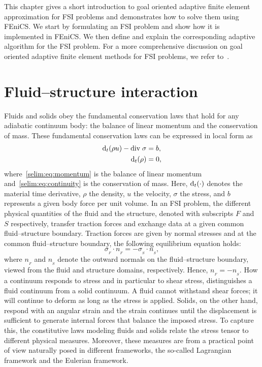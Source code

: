 This chapter gives a short introduction to goal oriented adaptive
finite element approximation for FSI problems and demonstrates how to
solve them using FEniCS. We start by formulating an FSI problem and
show how it is implemented in FEniCS. We then define and explain the
corresponding adaptive algorithm for the FSI problem. For a more
comprehensive discussion on goal oriented adaptive finite element
methods for FSI problems, we refer
to~\citet{SelimLogg2011a,Dunne2007,Dunne2006,
GratschBathe2006,BengzonLarson2010,ZeeBrummelenBorst2008a, Van2009}.
\section{Fluid--structure interaction}
\label{selim:sec:fsi}

Fluids and solids obey the fundamental conservation laws that hold
for any adiabatic continuum body: the balance of linear momentum and
the conservation of mass.  These fundamental conservation laws can be
expressed in local form as
\begin{align}
\label{selim:eq:momentum}
\textrm{d}_t(\rho u) - \textrm{div}\; \sigma &= b,
\\
\label{selim:eq:continuity}
\textrm{d}_t(\rho )  &= 0,
\end{align}
where~\eqref{selim:eq:momentum} is the balance of linear momentum
and~\eqref{selim:eq:continuity} is the conservation of mass.  Here,
$\textrm{d}_t(\cdot)$ denotes the material time derivative, $\rho$ the density,
$u$ the velocity, $\sigma$ the stress, and $b$ represents a given body
force per unit volume. In an FSI problem, the different physical
quantities of the fluid and the structure, denoted with subscripts
$F$ and $S$ respectively, transfer traction forces and exchange data
at a given common fluid--structure boundary.  Traction forces are
given by normal stresses and at the common fluid--structure boundary,
the following equilibrium equation holds:
\begin{equation}
\label{selim:eq:traction}
\sigma_{_{F}}\cdot n_{_{F}} =  - \sigma_{_{S}}\cdot n_{_{S}},
\end{equation}
where $n_{_{F}}$ and $n_{_{S}}$ denote the outward normals on the
fluid--structure boundary, viewed from the fluid and structure
domains, respectively. Hence, $n_{_{F}} = - n_{_{S}}$.  How a continuum
responds to stress and in particular to shear stress, distinguishes a
fluid continuum from a solid continuum. A fluid cannot withstand shear
forces; it will continue to deform as long as the stress is
applied. Solids, on the other hand, respond with an angular strain and
the strain continues until the displacement is sufficient to generate
internal forces that balance the imposed stress. To capture this, the
constitutive laws modeling fluids and solids relate the stress tensor
to different physical measures. Moreover, these measures are from a
practical point of view naturally posed in different frameworks, the
so-called Lagrangian framework and the Eulerian framework.

